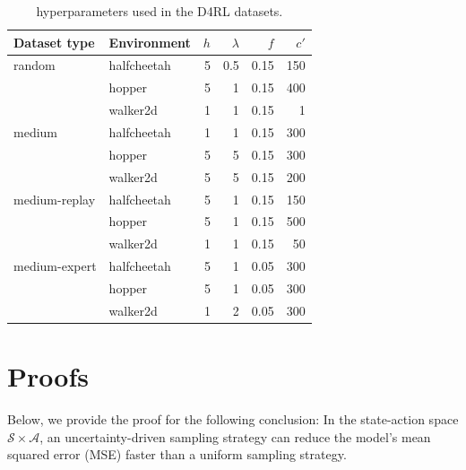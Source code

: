 \documentclass[letterpaper]{article} %
\begin{document}
\begin{table}
  \centering
  \begin{tabular}{llrrrr}
    \toprule
    \textbf{Dataset type} & \textbf{Environment} & $h$ & $\lambda$ & $f$ & $c'$\\
    \midrule
    random & halfcheetah  & 5 & 0.5 & 0.15 & 150\\
           & hopper  & 5 & 1 & 0.15 & 400\\
           & walker2d  & 1 & 1 & 0.15 & 1\\

    medium & halfcheetah  & 1 & 1 & 0.15 & 300\\
           & hopper  & 5 & 5 & 0.15 & 300\\
           & walker2d  & 5 & 5 & 0.15 & 200\\

    medium-replay & halfcheetah  & 5 & 1 & 0.15 & 150\\
            & hopper & 5 & 1 & 0.15 & 500\\
            & walker2d & 1 & 1 & 0.15 & 50\\

    medium-expert & halfcheetah  & 5 & 1 & 0.05 & 300\\
            & hopper  & 5 & 1 & 0.05 & 300\\
            & walker2d  & 1 & 2 & 0.05 & 300\\
    \bottomrule
  \end{tabular}
  \caption{hyperparameters used in the D4RL datasets.}
  \label{tab:ablation}
\end{table}

\section{Proofs}
Below, we provide the proof for the following conclusion: In the state-action space $\mathcal{S} \times \mathcal{A}$, an uncertainty-driven sampling strategy can reduce the model's mean squared error (MSE) faster than a uniform sampling strategy.
\end{document}
